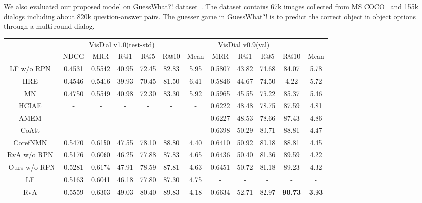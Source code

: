 \documentclass[10pt,twocolumn,letterpaper]{article}
\begin{document}
We also evaluated our proposed model on GuessWhat?! dataset~\cite{de2017guesswhat}. The dataset contains 67k images collected from MS COCO~\cite{lin2014microsoft} and 155k dialogs including about 820k question-answer pairs. The guesser game in GuessWhat?! is to predict the correct object in object options through a multi-round dialog.

\linespread{0.65}
\begin{table*}
\begin{center}
\small
\begin{tabular}{
cccccccccccc}
\toprule
\multirow{2}{*}{} & \multicolumn{5}{c}{VisDial v1.0(test-std)} & \multicolumn{5}{c}{VisDial v0.9(val)}  \\
\cmidrule(r){2-7} \cmidrule(r){8-12} 
&  NDCG      &  MRR   &   R@1   &   R@5   &R@10    &  Mean   
&  MRR   &   R@1   &   R@5   &R@10    &  Mean  \\
\midrule
LF w/o RPN~\cite{das2017visual}    &0.4531 &0.5542 &40.95 &72.45 &82.83 &5.95 &0.5807 &43.82 &74.68 &84.07 &5.78         \\
HRE~\cite{das2017visual}   &0.4546 &0.5416 &39.93 &70.45 &81.50 &6.41 &0.5846 &44.67 &74.50 &4.22  &5.72         \\
MN~\cite{das2017visual}    &0.4750 &0.5549 &40.98 &72.30 &83.30 &5.92 &0.5965 &45.55 &76.22 &85.37 &5.46         \\
HCIAE~\cite{lu2017best}   &- &- &- &- &- &-                        &0.6222 &48.48 &78.75 &87.59 &4.81         \\
AMEM~\cite{seo2017visual}  &- &- &- &- &- &-                          &0.6227 &48.53 &78.66 &87.43 &4.86         \\
CoAtt~\cite{lu2016hierarchical} &- &- &- &- &- &-                          &0.6398 &50.29 &80.71 &88.81 &4.47         \\
CorefNMN~\cite{kottur2018visual}  &0.5470 &0.6150 &47.55 &78.10 &88.80 &4.40 &0.6410 &50.92 &80.18 &88.81 &4.45     \\
RvA w/o RPN~\cite{niu2018recursive} &0.5176 &0.6060 &46.25 &77.88 &87.83 &4.65 &0.6436 &50.40 &81.36 &89.59 &4.22   \\
Ours w/o RPN   &0.5281 &0.6174 &47.91 &78.59 &87.81 &4.63 &0.6451 &50.72 &81.18 &89.23 &4.32\\
\midrule
LF~\cite{das2017visual}    &0.5163	&0.6041	&46.18	&77.80	&87.30	&4.75 &- &- &- &- &-                        \\
RvA~\cite{niu2018recursive}   &0.5559 &0.6303 &49.03 &80.40 &89.83 &4.18 &0.6634 &52.71 &82.97 &\textbf{90.73} &\textbf{3.93}         \\

\end{tabular}
\end{center}
\end{table*}
\end{document}

